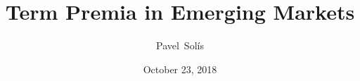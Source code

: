 
\title[]{Term Premia in Emerging Markets}
\author[]{Pavel~Solís}
\date[]{October 23, 2018}

\frame{\titlepage}
